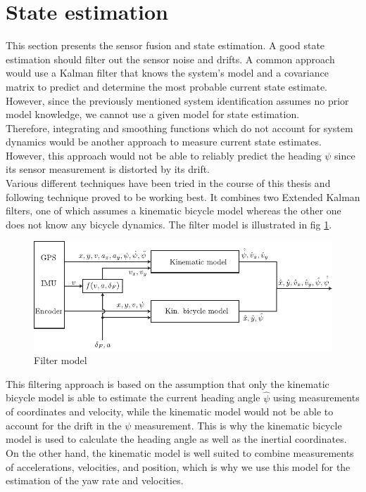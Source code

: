 \section{State estimation}
This section presents the sensor fusion and state estimation. A good state estimation should filter out the sensor noise and drifts. A common approach would use a Kalman filter that knows the system's model and a covariance matrix to predict and determine the most probable current state estimate. However, since the previously mentioned system identification assumes no prior model knowledge, we cannot use a given model for state estimation.\\
Therefore, integrating and smoothing functions which do not account for system dynamics would be another approach to measure current state estimates. However, this approach would not be able to reliably predict the heading $\psi$ since its sensor measurement is distorted by its drift.\\
Various different techniques have been tried in the course of this thesis and following technique proved to be working best. It combines two Extended Kalman filters, one of which assumes a kinematic bicycle model whereas the other one does not know any bicycle dynamics. The filter model is illustrated in fig \ref{fig:filter_model}.

\begin{figure}[ht]
    \centering
      \includegraphics{../../Figures/Illustrator/FilterModel.pdf}
    \caption{Filter model}
    \label{fig:filter_model}
\end{figure}
This filtering approach is based on the assumption that only the kinematic bicycle model is able to estimate the current heading angle $\hat\psi$ using measurements of coordinates and velocity, while the kinematic model would not be able to account for the drift in the $\psi$ measurement. This is why the kinematic bicycle model is used to calculate the heading angle as well as the inertial coordinates. On the other hand, the kinematic model is well suited to combine measurements of accelerations, velocities, and position, which is why we use this model for the estimation of the yaw rate and velocities.

